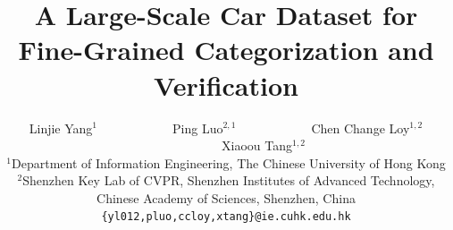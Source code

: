 \documentclass[10pt,twocolumn,letterpaper]{article}
\begin{document}
\title{A Large-Scale Car Dataset for Fine-Grained Categorization and Verification}

\author{Linjie Yang$^{1}$~~~~~~~~~~~~Ping Luo$^{2,1}$~~~~~~~~~~~~Chen Change Loy$^{1,2}$~~~~~~~~~~~~Xiaoou Tang$^{1,2}$\\
$^1$Department of Information Engineering, The Chinese University of Hong Kong\\
$^2$Shenzhen Key Lab of CVPR, Shenzhen Institutes of Advanced Technology, \\
Chinese Academy of Sciences, Shenzhen, China\\
{\tt\small \{yl012,pluo,ccloy,xtang\}@ie.cuhk.edu.hk}
}

\maketitle
\end{document}
